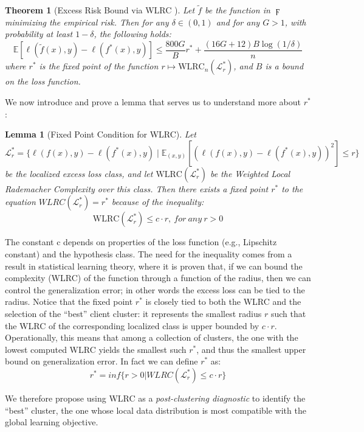 \documentclass{article}
\newtheorem{theorem}{Theorem}
\newtheorem{lemma}{Lemma}
\begin{document}
\begin{theorem}[Excess Risk Bound via WLRC {\cite{WLRC}}]
Let \( \tilde{f} \) be the function in \( \digamma \) minimizing the empirical risk. Then for any \( \delta \in (0, 1) \) and for any \( G > 1 \), with probability at least \( 1 - \delta \), the following holds:
\[
\mathbb{E}[\ell(\tilde{f}(x), y) - \ell(f^*(x), y)] \leq \frac{800G}{B}r^* + \frac{(16G + 12)B \log(1/\delta)}{n}
\]
where \( r^* \) is the fixed point of the function \( r \mapsto \text{WLRC}_n(\mathcal{L}^*_r) \), and \( B \) is a bound on the loss function.
\end{theorem}
We now introduce and prove a lemma that serves us to understand more about $r^*$:
 \begin{lemma}[Fixed Point Condition for WLRC]
Let $\mathcal{L}_r^* = \{ \ell(f(x),y) - \ell(f^*(x),y) \mid \mathbb{E}_{(x,y)}[(\ell(f(x),y) - \ell(f^*(x),y))^2] \leq r \}$ 
be the localized excess loss class, and let $\text{WLRC}(\mathcal{L}_r^*)$ be the 
Weighted Local Rademacher Complexity over this class. Then there exists 
a fixed point $r^*$ to the equation $WLRC(\mathcal{L}_r^*) = r^*$ because of the inequality:
\[
\text{WLRC}(\mathcal{L}_{r}^*) \leq c \cdot r,\ for\ any\ r > 0
\]
\end{lemma}
The constant c depends on properties of the loss function (e.g., Lipschitz constant) and the hypothesis class. The need for the inequality comes from a result in statistical learning theory, where it is proven that, if we can bound the complexity (WLRC) of the function through a function of the radius, then we can control the generalization error; in other words the excess loss can be tied to the radius.
Notice that the fixed point \( r^* \) is closely tied to both the WLRC and the selection of the ``best'' client cluster: it represents the smallest radius \( r \) such that the WLRC of the corresponding localized class is upper bounded by \( c \cdot r \). Operationally, this means that among a collection of clusters, the one with the lowest computed WLRC yields the smallest such \( r^* \), and thus the smallest upper bound on generalization error.
In fact we can define $r^*$ as:
\begin{equation}
    r^* = inf\{ r > 0 | WLRC(\mathcal{L}_{r}^{*}) \leq c \cdot r\}
\end{equation}


We therefore propose using WLRC as a \emph{post-clustering diagnostic} to identify the ``best'' cluster, the one whose local data distribution is most compatible with the global learning objective.
\end{document}

